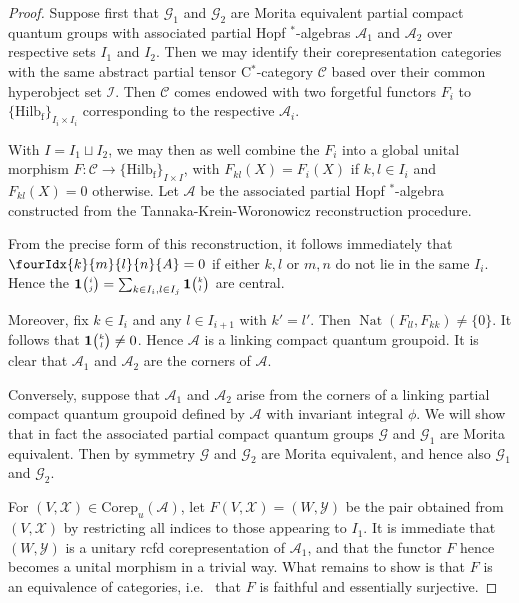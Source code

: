 \documentclass[10pt]{article}
\DeclareMathOperator{\fin}{\mathrm{f}}
\DeclareMathOperator{\Nat}{\mathrm{Nat}}
\newcommand{\Corep}{\mathrm{Corep}}
\newcommand{\CatCC}{\mathscr{C}}
\newcommand{\Hilb}{\mathrm{Hilb}}
\newcommand{\Grt}[3]{#1{\tiny {\begin{pmatrix} #2\\#3\end{pmatrix}}}}
\newcommand{\UnitC}[2]{\Grt{\mathbf{1}}{#1}{#2}}
\newcommand{\Gr}[5]{\fourIdx{#2}{#4}{#3}{#5}{#1}}%
\theoremstyle{definition}
\numberwithin{equation}{section}
\begin{document}
\begin{proof} Suppose first that $\mathscr{G}_1$ and $\mathscr{G}_2$ are Morita equivalent partial compact quantum groups with associated partial Hopf $^*$-algebras $\mathscr{A}_1$ and $\mathscr{A}_2$ over respective sets $I_1$ and $I_2$. Then we may identify their corepresentation categories with the same abstract partial tensor C$^*$-category $\CatCC$ based over their common hyperobject set $\mathscr{I}$. Then $\CatCC$ comes endowed with two forgetful functors $F_i$ to $\{\Hilb_{\fin}\}_{I_i\times I_i}$ corresponding to the respective $\mathscr{A}_i$.

With $I = I_1\sqcup I_2$, we may then as well combine the $F_i$ into a global unital morphism $F:\CatCC \rightarrow \{\Hilb_{\fin}\}_{I\times I}$, with $F_{kl}(X)=F_i(X)$ if $k,l\in I_i$ and $F_{kl}(X)=0$ otherwise. Let $\mathscr{A}$ be the associated partial Hopf $^*$-algebra constructed from the Tannaka-Krein-Woronowicz reconstruction procedure. 

From the precise form of this reconstruction, it follows immediately that $\Gr{A}{k}{l}{m}{n} =0$ if either $k,l$ or $m,n$ do not lie in the same $I_i$. Hence the $\UnitC{i}{j} = \sum_{k\in I_i,l\in I_j} \UnitC{k}{l}$ are central. 

Moreover, fix $k\in I_i$ and any $l\in I_{i+1}$ with $k'=l'$. Then $\Nat(F_{ll},F_{kk})\neq \{0\}$. It follows that $\UnitC{k}{l}\neq 0$. Hence $\mathscr{A}$ is a linking compact quantum groupoid. It is clear that $\mathscr{A}_1$ and $\mathscr{A}_2$ are the corners of $\mathscr{A}$. 

Conversely, suppose that $\mathscr{A}_1$ and $\mathscr{A}_2$ arise from the corners of a linking partial compact quantum groupoid defined by $\mathscr{A}$ with invariant integral $\phi$. We will show that in fact the associated partial compact quantum groups $\mathscr{G}$ and $\mathscr{G}_1$ are Morita equivalent. Then by symmetry $\mathscr{G}$ and $\mathscr{G}_2$ are Morita equivalent, and hence also $\mathscr{G}_1$ and $\mathscr{G}_2$.

For $(V,\mathscr{X}) \in \Corep_u(\mathscr{A})$, let $F(V,\mathscr{X}) = (W,\mathscr{Y})$ be the pair obtained from $(V,\mathscr{X})$ by restricting all indices to those appearing to $I_1$. It is immediate that $(W,\mathscr{Y})$ is a unitary rcfd corepresentation of $\mathscr{A}_1$, and that the functor $F$ hence becomes a unital morphism in a trivial way. What remains to show is that $F$ is an equivalence of categories, i.e.~ that $F$ is faithful and essentially surjective. 


\end{proof}
\end{document}
